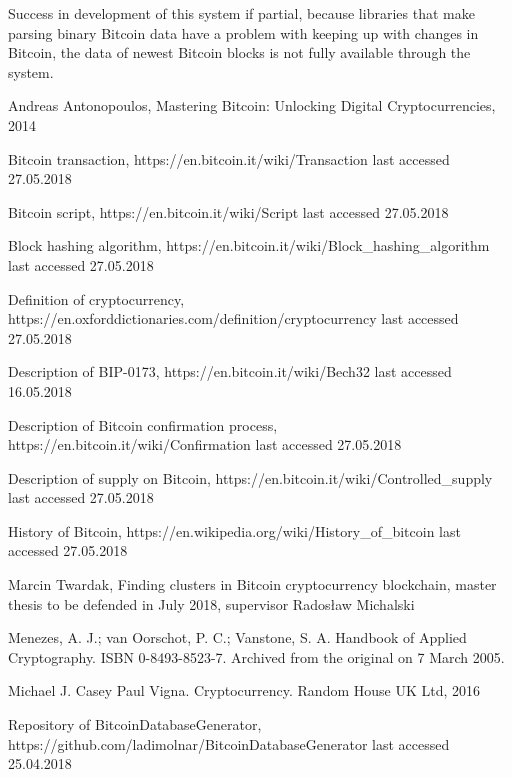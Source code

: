 \documentclass[12pt, en, eng, twoside, final]{mgr}
\begin{document}
Success in development of this system if partial, because libraries that make parsing binary Bitcoin data have a problem with keeping up with changes in Bitcoin, the data of newest Bitcoin blocks is not fully available through the system.    
   

\begin{thebibliography}{9}

Andreas Antonopoulos, Mastering Bitcoin: Unlocking Digital Cryptocurrencies, 2014

Bitcoin transaction, https://en.bitcoin.it/wiki/Transaction last accessed 27.05.2018

Bitcoin script, https://en.bitcoin.it/wiki/Script last accessed 27.05.2018
 
Block hashing algorithm, https://en.bitcoin.it/wiki/Block\_hashing\_algorithm last accessed 27.05.2018

Definition of cryptocurrency, https://en.oxforddictionaries.com/definition/cryptocurrency last accessed 27.05.2018

Description of BIP-0173, https://en.bitcoin.it/wiki/Bech32 last accessed 16.05.2018

Description of Bitcoin confirmation process, https://en.bitcoin.it/wiki/Confirmation last accessed 27.05.2018

Description of supply on Bitcoin, https://en.bitcoin.it/wiki/Controlled\_supply last accessed 27.05.2018

History of Bitcoin, https://en.wikipedia.org/wiki/History\_of\_bitcoin last accessed 27.05.2018

Marcin Twardak, Finding
clusters in Bitcoin cryptocurrency blockchain, master thesis to be defended in July 2018, supervisor Radosław Michalski

Menezes, A. J.; van Oorschot, P. C.; Vanstone, S. A. Handbook of Applied Cryptography. ISBN 0-8493-8523-7. Archived from the original on 7 March 2005.

Michael J. Casey Paul Vigna. Cryptocurrency. Random House UK Ltd, 2016

Repository of BitcoinDatabaseGenerator, 
\newline
https://github.com/ladimolnar/BitcoinDatabaseGenerator last accessed 25.04.2018


\end{thebibliography}
\end{document}
